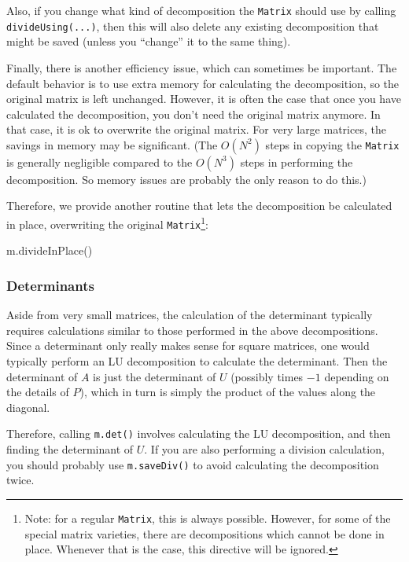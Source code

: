\documentclass[twoside,letterpaper,11pt]{article}
\renewcommand{\tt}[1]{{\lstinline {#1}}}
\begin{document}
Also, if you change what kind of decomposition the \tt{Matrix} should use by calling
\tt{divideUsing(...)}, then this will also delete any existing decomposition that 
might be saved (unless you ``change'' it to the same thing).

Finally, there is another efficiency issue, which can sometimes be important.  The default
behavior is to use extra memory for calculating the decomposition, so the original
matrix is left unchanged.  However, it is often the case that once you have 
calculated the decomposition, you don't need the original matrix anymore.
In that case, it is ok to overwrite the original matrix.  For very large matrices, 
the savings in memory may be significant.  (The $O(N^2)$ steps in copying 
the \tt{Matrix} is generally negligible compared to the $O(N^3)$ steps in performing
the decomposition.  So memory issues are probably the only reason to do this.)

Therefore, we provide another routine that lets the decomposition be 
calculated in place, overwriting the original \tt{Matrix}\footnote{
Note: for a regular \tt{Matrix}, this is always possible.  However, for some of the 
special matrix varieties, there are decompositions which cannot be done in place.
Whenever that is the case, this directive will be ignored.}:
\begin{tmvcode}
m.divideInPlace()
\end{tmvcode}

\subsubsection{Determinants}
\label{determinants}

Aside from very small matrices, the calculation of the determinant typically 
requires calculations similar to those performed in
the above decompositions.  Since a determinant only really makes sense
for square matrices, one would typically perform an LU decomposition to calculate
the determinant.  Then the determinant of $A$ is just the determinant of $U$
(possibly times $-1$ depending on the details of $P$), which in turn is simply the 
product of the values along the diagonal.

Therefore, calling \tt{m.det()} involves calculating the LU decomposition, and then
finding the determinant of $U$.  
If you are also performing a division calculation, you should probably use
\tt{m.saveDiv()} to avoid calculating the decomposition twice.
\end{document}
